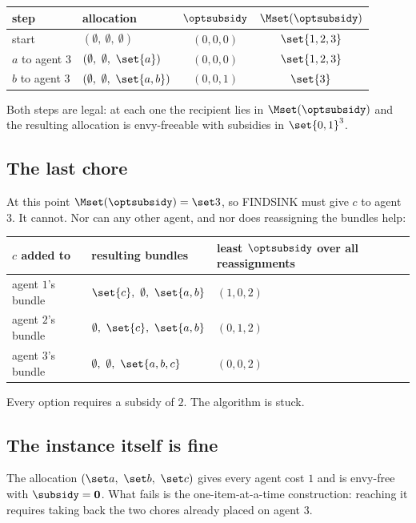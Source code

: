 \begin{center}
\begin{tabular}{llcc}
step & allocation & $\optsubsidy$ & $\Mset(\optsubsidy)$ \\
\hline
start & $(\emptyset,\ \emptyset,\ \emptyset)$ & $(0,0,0)$ & $\set{1,2,3}$ \\
$a$ to agent $3$ & $(\emptyset,\ \emptyset,\ \set{a})$ & $(0,0,0)$ & $\set{1,2,3}$ \\
$b$ to agent $3$ & $(\emptyset,\ \emptyset,\ \set{a,b})$ & $(0,0,1)$ & $\set{3}$ \\
\end{tabular}
\end{center}

Both steps are legal: at each one the recipient lies in $\Mset(\optsubsidy)$
and the resulting allocation is envy-freeable with subsidies in $\set{0,1}^3$.

\subsection{The last chore}

At this point $\Mset(\optsubsidy) = \set 3$, so FINDSINK must give $c$ to agent
$3$. It cannot. Nor can any other agent, and nor does reassigning the bundles
help:

\begin{center}
\begin{tabular}{lll}
$c$ added to & resulting bundles & least $\optsubsidy$ over all reassignments \\
\hline
agent $1$'s bundle & $\set{c},\ \emptyset,\ \set{a,b}$ & $(1,0,2)$ \\
agent $2$'s bundle & $\emptyset,\ \set{c},\ \set{a,b}$ & $(0,1,2)$ \\
agent $3$'s bundle & $\emptyset,\ \emptyset,\ \set{a,b,c}$ & $(0,0,2)$ \\
\end{tabular}
\end{center}

Every option requires a subsidy of $2$. The algorithm is stuck.

\subsection{The instance itself is fine}

The allocation $(\set a,\ \set b,\ \set c)$ gives every agent cost $1$ and is
envy-free with $\subsidy = \mathbf 0$. What fails is the one-item-at-a-time
construction: reaching it requires taking back the two chores already placed on
agent $3$.
